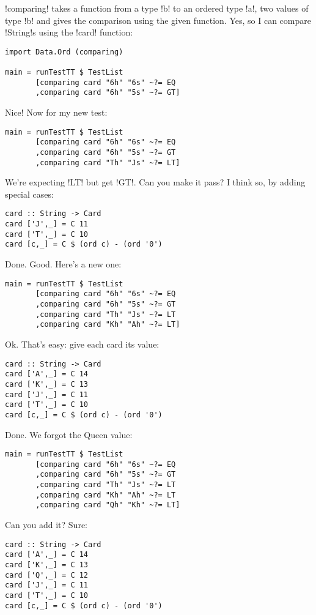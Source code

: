 \il!comparing! takes a function from a type \il!b! to an ordered type \il!a!, two values of type \il!b! and gives the comparison using the given function.
\lhN Yes, so I can compare \il!String!s using the \il!card! function:
\begin{lstlisting}[frame=single]
import Data.Ord (comparing)

main = runTestTT $ TestList 
       [comparing card "6h" "6s" ~?= EQ
       ,comparing card "6h" "5s" ~?= GT]
\end{lstlisting} %
\hspace*{\fill}
\lhA \success Nice!
\lhN Now for my new test:
\begin{lstlisting}[frame=single]
main = runTestTT $ TestList 
       [comparing card "6h" "6s" ~?= EQ
       ,comparing card "6h" "5s" ~?= GT
       ,comparing card "Th" "Js" ~?= LT]
\end{lstlisting} %
\failure We're expecting \il!LT! but get \il!GT!. Can you make it pass?
\lhA
\failure I think so, by adding special cases:
\begin{lstlisting}[frame=single]
card :: String -> Card
card ['J',_] = C 11
card ['T',_] = C 10
card [c,_] = C $ (ord c) - (ord '0')
\end{lstlisting} %
\success Done.
\lhN Good. Here's a new one:
\begin{lstlisting}[frame=single]
main = runTestTT $ TestList 
       [comparing card "6h" "6s" ~?= EQ
       ,comparing card "6h" "5s" ~?= GT
       ,comparing card "Th" "Js" ~?= LT
       ,comparing card "Kh" "Ah" ~?= LT]
\end{lstlisting} %
\hspace*{\fill} 
\lhA \failure Ok. That's easy: give each card its value:
\begin{lstlisting}[frame=single]
card :: String -> Card
card ['A',_] = C 14
card ['K',_] = C 13
card ['J',_] = C 11
card ['T',_] = C 10
card [c,_] = C $ (ord c) - (ord '0')
\end{lstlisting} %
\success Done.
\lhN We forgot the Queen value:
\begin{lstlisting}[frame=single]
main = runTestTT $ TestList 
       [comparing card "6h" "6s" ~?= EQ
       ,comparing card "6h" "5s" ~?= GT
       ,comparing card "Th" "Js" ~?= LT
       ,comparing card "Kh" "Ah" ~?= LT
       ,comparing card "Qh" "Kh" ~?= LT]
\end{lstlisting} %
Can you add it?
\lhA \failure Sure:
\begin{lstlisting}[frame=single]
card :: String -> Card
card ['A',_] = C 14
card ['K',_] = C 13
card ['Q',_] = C 12
card ['J',_] = C 11
card ['T',_] = C 10
card [c,_] = C $ (ord c) - (ord '0')
\end{lstlisting} %
